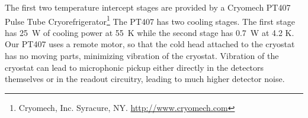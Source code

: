 \documentclass[10pt,twocolumn,article]{memoir}
\begin{document}
The first two temperature intercept stages are provided by a Cryomech PT407 Pulse Tube Cryorefrigerator\footnote{Cryomech, Inc. Syracure, NY. \url{http://www.cryomech.com}}
The PT407 has two cooling stages.
The first stage has 25~W of cooling power at 55~K while the second stage has 0.7~W at 4.2 K.
Our PT407 uses a remote motor, so that the cold head attached to the cryostat has no moving parts, minimizing vibration of the cryostat.
Vibration of the cryostat can lead to microphonic pickup either directly in the detectors themselves or in the readout circuitry, leading to much higher detector noise.

\begin{figure}[t]
\centering
{}
\end{figure}
\end{document}
